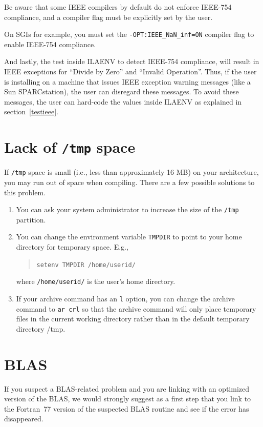 \documentclass[11pt]{report}
\begin{document}
Be aware
that some IEEE compilers by default do not enforce IEEE-754 compliance, and
a compiler flag must be explicitly set by the user.

On SGIs for example, you must set the \texttt{-OPT:IEEE\_NaN\_inf=ON} compiler
flag to enable IEEE-754 compliance.

And lastly, the test inside ILAENV to detect IEEE-754 compliance, will
result in IEEE exceptions for ``Divide by Zero'' and ``Invalid Operation''.
Thus, if the user is installing on a machine that issues IEEE exception
warning messages (like a Sun SPARCstation), the user can disregard these
messages.  To avoid these messages, the user can hard-code the values
inside ILAENV as explained in section~\ref{testieee}.

\section{Lack of \texttt{/tmp} space}

If \texttt{/tmp} space is small (i.e., less than approximately 16 MB) on your
architecture, you may run out of space
when compiling.  There are a few possible solutions to this problem.
\begin{enumerate}
\item You can ask your system administrator to increase the size of the
\texttt{/tmp} partition.
\item You can change the environment variable \texttt{TMPDIR} to point to
your home directory for temporary space.  E.g.,
\begin{quote}
\texttt{setenv TMPDIR /home/userid/}
\end{quote}
where \texttt{/home/userid/} is the user's home directory.
\item If your archive command has an \texttt{l} option, you can change the
archive command to \texttt{ar crl} so that the
archive command will only place temporary files in the current working
directory rather than in the default temporary directory /tmp.
\end{enumerate}

\section{BLAS}

If you suspect a BLAS-related problem and you are linking
with an optimized version of the BLAS, we would strongly suggest
as a first step that you link to the Fortran~77 version of
the suspected BLAS routine and see if the error has disappeared.
\end{document}
